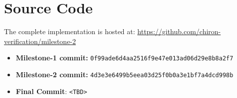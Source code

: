 
\section*{Source Code}

The complete implementation is hosted at:
\url{https://github.com/chiron-verification/milestone-2}

\begin{itemize}[leftmargin=1.5em]
	\item \textbf{Milestone-1 commit:}
	\texttt{0f99ade6d4aa2516f9e47e013ad06d29e8b8a2f7}
	\item \textbf{Milestone-2 commit:}
	\texttt{4d3e3e6499b5eea03d25f0b0a3e1bf7a4dcd998b}
	\item \textbf{Final Commit}:
	\texttt{<TBD>}

\end{itemize}

